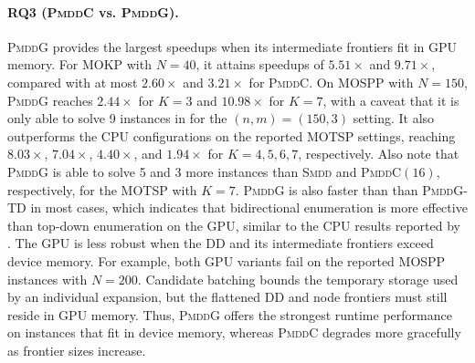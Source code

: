 \documentclass[letterpaper]{article}
\begin{document}
\paragraph{RQ3 (\textsc{PmddC} vs. \textsc{PmddG}).}
\textsc{PmddG} provides the largest speedups when its intermediate frontiers fit in GPU memory. For MOKP with $N=40$, it attains speedups of $5.51\times$ and $9.71\times$, compared with at most $2.60\times$ and $3.21\times$ for \textsc{PmddC}. On MOSPP with $N=150$, \textsc{PmddG} reaches $2.44\times$ for $K=3$ and $10.98\times$ for $K=7$, with a caveat that it is only able to solve 9 instances in for the $(n,m)=(150,3)$ setting.
It also outperforms the CPU configurations on the reported MOTSP settings, reaching $8.03\times$, $7.04\times$, $4.40\times$, and $1.94\times$ for $K=4,5,6,7$, respectively. 
Also note that \textsc{PmddG} is able to solve 5 and 3 more instances than \textsc{Smdd} and \textsc{PmddC$(16)$}, respectively, for the MOTSP with $K=7$. \textsc{PmddG} is also faster than than \textsc{PmddG-TD} in most cases, which indicates that bidirectional enumeration is more effective than top-down enumeration on the GPU, similar to the CPU results reported by \citet{bergman2022network}.
The GPU is less robust when the DD and its intermediate frontiers exceed device memory. For example, both GPU variants fail on the reported MOSPP instances with $N=200$. Candidate batching bounds the temporary storage used by an individual expansion, but the flattened DD and node frontiers must still reside in GPU memory. Thus, \textsc{PmddG} offers the strongest runtime performance on instances that fit in device memory, whereas \textsc{PmddC} degrades more gracefully as frontier sizes increase. 
\end{document}
